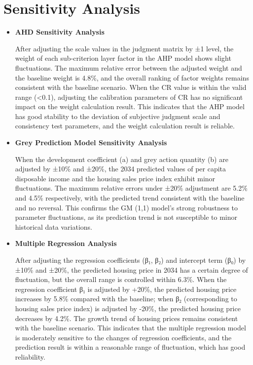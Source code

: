 \documentclass{mcmthesis}
\begin{document}
\section{Sensitivity Analysis} %
\begin{itemize}
    \item \textbf{AHD Sensitivity Analysis}
    
    After adjusting the scale values in the judgment matrix by ±1 level, 
    the weight of each sub-criterion layer factor in the AHP model shows slight fluctuations.  
    The maximum relative error between the adjusted weight and the baseline weight is 4.8\%, 
    and the overall ranking of factor weights remains consistent with the baseline scenario.  
    When the CR value is within the valid range (<0.1), adjusting the calibration parameters of 
    CR has no significant impact on the weight calculation result.  
    This indicates that the AHP model has good stability to the deviation of subjective judgment scale and 
    consistency test parameters, and the weight calculation result is reliable.

    \item \textbf{Grey Prediction Model Sensitivity Analysis}
    
    When the development coefficient (a) and grey action quantity (b) are adjusted by ±10\% and ±20\%, 
    the 2034 predicted values of per capita disposable income and the housing sales price index exhibit minor fluctuations.
    The maximum relative errors under ±20\% adjustment are 5.2\% and 4.5\% respectively, 
    with the predicted trend consistent with the baseline and no reversal. 
    This confirms the GM (1,1) model's strong robustness to parameter fluctuations, 
    as its prediction trend is not susceptible to minor historical data variations.

    \item \textbf{Multiple Regression Analysis}
    
    After adjusting the regression coefficients (β₁, β₂) and intercept term (β₀) by ±10\% and ±20\%, 
    the predicted housing price in 2034 has a certain degree of fluctuation, 
    but the overall range is controlled within 6.3\%. 
    When the regression coefficient β₁ is adjusted by +20\%, 
    the predicted housing price increases by 5.8\% compared with the baseline;    
    when β₂ (corresponding to housing sales price index) is adjusted by -20\%, 
    the predicted housing price decreases by 4.2\%.    
    The growth trend of housing prices remains consistent with the baseline scenario.    
    This indicates that the multiple regression model is moderately sensitive to the changes of regression coefficients, 
    and the prediction result is within a reasonable range of fluctuation, which has good reliability.
\end{itemize}
\end{document}
